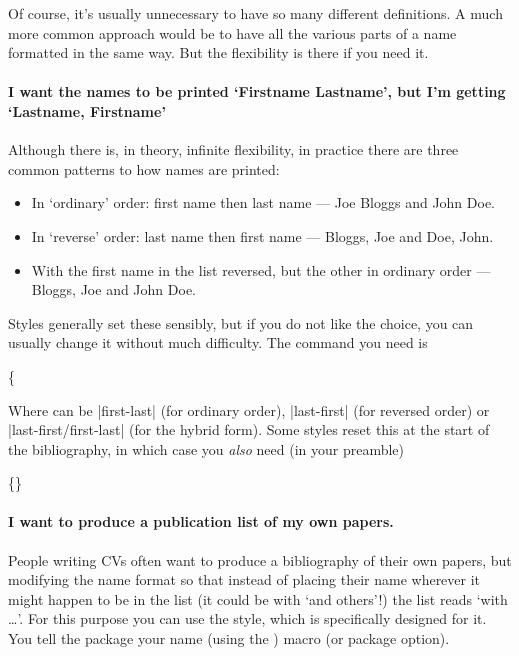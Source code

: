 Of course, it's usually unnecessary to have so many different
definitions. A much more common approach would be to have all the
various parts of a name formatted in the same way. But the flexibility
is there if you need it.

\paragraph{I want the names to be printed `Firstname Lastname', but
  I'm getting `Lastname, Firstname'} Although there is, in theory,
infinite flexibility, in practice there are three common patterns to
how names are printed:
\begin{itemize}
\item In `ordinary' order: first name then last name --- Joe Bloggs
  and John Doe.
\item In `reverse' order: last name then first name --- Bloggs, Joe
  and Doe, John.
\item With the first name in the list reversed, but the other in
  ordinary order --- Bloggs, Joe and John Doe.
\end{itemize}
Styles generally set these sensibly, but if you do not like the
choice, you can usually change it without much difficulty. The command
you need is
\begin{pseudoverb}
  \{
\end{pseudoverb}
Where  can be |first-last| (for ordinary order),
|last-first| (for reversed order) or |last-first/first-last| (for the
hybrid form). Some styles reset this at the start of the bibliography,
in which case you \emph{also} need (in your preamble)
\begin{pseudoverb}
\{\}
\end{pseudoverb}

\paragraph{I want to produce a publication list of my own papers.}
People writing CVs often want to produce a bibliography of their own
papers, but modifying the name format so that instead of placing their
name wherever it might happen to be in the list (it could be with `and
others'!) the list reads `with \ldots'. For this purpose you can use
the  style, which is specifically designed
for it. You tell the package your name (using the ) macro
(or package option).

